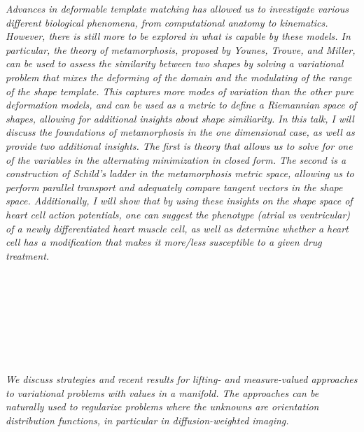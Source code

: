   \begin{multicols}{2}
      \textit{Advances in deformable template matching has allowed us to investigate various different biological phenomena, from computational anatomy to kinematics.  However, there is still more to be explored in what is capable by these models.  In particular, the theory of metamorphosis, proposed by Younes, Trouve, and Miller, can be used to assess the similarity between two shapes by solving a variational problem that mixes the deforming of the domain and the modulating of the range of the shape template. This captures more modes of variation than the other pure deformation models, and can be used as a metric to define a Riemannian space of shapes, allowing for additional insights about shape similiarity.
In this talk, I will discuss the foundations of metamorphosis in the one dimensional case, as well as provide two additional insights.  The first is theory that allows us to solve for one of the variables in the alternating minimization in closed form.  The second is a construction of Schild's ladder in the metamorphosis metric space, allowing us to perform parallel transport and adequately compare tangent vectors in the shape space.  Additionally, I will show that by using these insights on the shape space of heart cell action potentials, one can suggest the phenotype (atrial vs ventricular) of a newly differentiated heart muscle cell, as
well as determine whether a heart cell has a modification that makes it more/less susceptible to a given drug treatment.}\\
\\ 
        \\
        \\\\
        \\
        \\\\
\\
      \textit{We discuss strategies and recent results for lifting- and measure-valued approaches to variational problems with values in a manifold. The approaches can be naturally used to regularize problems where the unknowns are orientation distribution functions, in particular in diffusion-weighted imaging.}\\
\\ 
        \\
        \\\\

\end{multicols}
